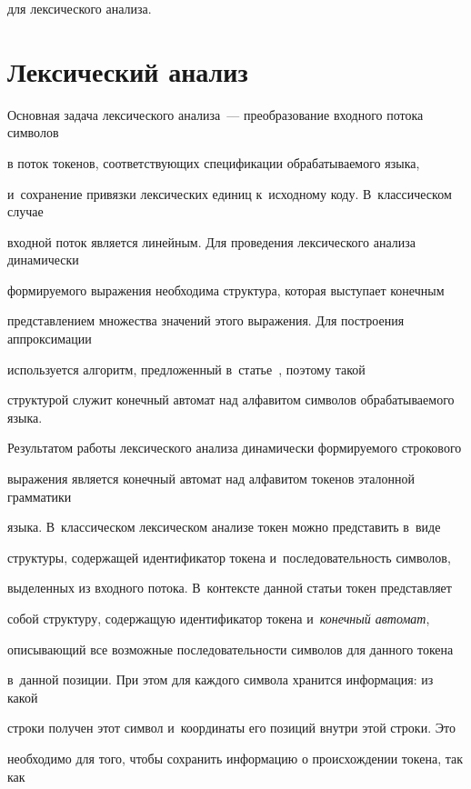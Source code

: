 для лексического анализа.





\section{Лексический анализ}





Основная задача лексического анализа~--- преобразование входного потока символов 


в поток токенов, соответствующих спецификации обрабатываемого языка, 


и~сохранение привязки лексических единиц к~исходному коду. В~классическом случае 


входной поток является линейным. Для проведения лексического анализа динамически 


формируемого выражения необходима структура, которая выступает  конечным 


представлением множества значений этого выражения. Для построения аппроксимации 


используется алгоритм, предложенный в~статье~\cite{AlgoFangYu}, поэтому такой 


структурой служит конечный автомат над алфавитом символов обрабатываемого языка.





Результатом работы лексического анализа динамически формируемого строкового 


выражения является конечный автомат над алфавитом токенов эталонной грамматики 


языка. В~классическом лексическом анализе токен можно представить в~виде 


структуры, содержащей идентификатор токена и~последовательность символов, 


выделенных из входного потока. В~контексте данной статьи токен представляет 


собой структуру, содержащую идентификатор токена и~\textit{конечный автомат}, 


описывающий все возможные последовательности символов для данного токена 


в~данной позиции. При этом для каждого символа хранится информация: из какой 


строки получен этот символ и~координаты его позиций внутри этой строки. Это 


необходимо для того, чтобы сохранить информацию о происхождении токена, так как 



